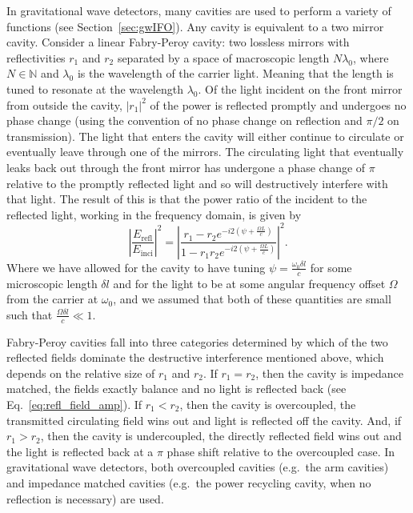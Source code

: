 \documentclass[aps,pra,superscriptaddress,reprint,nofootinbib]{revtex4-1}
\newcommand{\abs}[1]{\left\lvert #1 \right\rvert}
\begin{document}
In gravitational wave detectors, many cavities are used to perform a variety of functions (see Section~\ref{sec:gwIFO}). Any cavity is equivalent to a two mirror cavity. Consider a linear Fabry-Peroy cavity: two lossless mirrors with reflectivities $r_1$ and $r_2$ separated by a space of macroscopic length $N \lambda_0$, where $N \in \mathbb{N}$ and $\lambda_0$ is the wavelength of the carrier light. Meaning that the length is tuned to resonate at the wavelength $\lambda_0$. Of the light incident on the front mirror from outside the cavity, $\abs{r_1}^2$ of the power is reflected promptly and undergoes no phase change (using the convention of no phase change on reflection and $\pi/2$ on transmission). The light that enters the cavity will either continue to circulate or eventually leave through one of the mirrors. The circulating light that eventually leaks back out through the front mirror has undergone a phase change of $\pi$ relative to the promptly reflected light and so will destructively interfere with that light. The result of this is that the power ratio of the incident to the reflected light, working in the frequency domain, is given by~\cite{Danilishin_2012}
\begin{equation}
\label{eq:refl_field_amp}
\abs{\frac{E_{\mathrm{refl}}}{E_{\mathrm{inci}}}}^2 = \abs{\frac{r_1 - r_2 e^{-i 2 (\psi + \frac{\Omega L}{c})}}{1- r_1 r_2 e^{-i 2 (\psi + \frac{\Omega L}{c})}}}^2.
\end{equation}
Where we have allowed for the cavity to have tuning $\psi = \frac{\omega_0 \delta l}{c}$ for some microscopic length $\delta l$ and for the light to be at some angular frequency offset $\Omega$ from the carrier at $\omega_0$, and we assumed that both of these quantities are small such that $\frac{\Omega \delta l}{c} \ll 1$.

Fabry-Peroy cavities fall into three categories determined by which of the two reflected fields dominate the destructive interference mentioned above, which depends on the relative size of $r_1$ and $r_2$. If $r_1 = r_2$, then the cavity is impedance matched, the fields exactly balance and no light is reflected back (see Eq.~\ref{eq:refl_field_amp}). If $r_1 < r_2$, then the cavity is overcoupled, the transmitted circulating field wins out and light is reflected off the cavity. And, if $r_1 > r_2$, then the cavity is undercoupled, the directly reflected field wins out and the light is reflected back at a $\pi$ phase shift relative to the overcoupled case. In gravitational wave detectors, both overcoupled cavities (e.g.\ the arm cavities) and impedance matched cavities (e.g.\ the power recycling cavity, when no reflection is necessary) are used.
\end{document}
